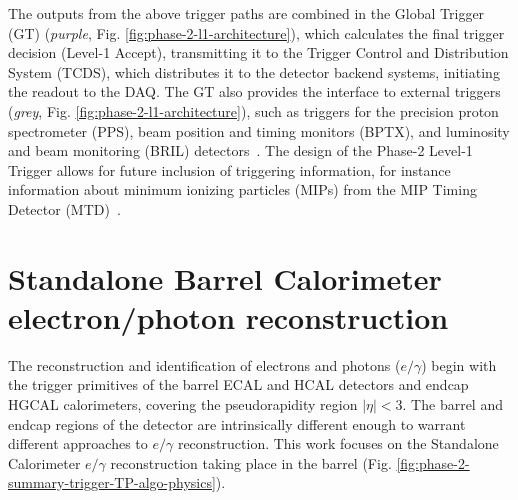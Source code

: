 The outputs from the above trigger paths are combined in the Global Trigger (GT) (\textit{purple}, Fig. \ref{fig:phase-2-l1-architecture}), which calculates the final trigger decision (Level-1 Accept), transmitting it to the Trigger Control and Distribution System (TCDS), which distributes it to the detector backend systems, initiating the readout to the DAQ. The GT also provides the interface to external triggers (\textit{grey}, Fig. \ref{fig:phase-2-l1-architecture}), such as triggers for the precision proton spectrometer (PPS), beam position and timing monitors (BPTX), and luminosity and beam monitoring (BRIL) detectors~\cite{CMS-TDR-021}. The design of the Phase-2 Level-1 Trigger allows for future inclusion of triggering information, for instance information about minimum ionizing particles (MIPs) from the MIP Timing Detector (MTD)~\cite{CERN-LHCC-2017-027}.

\section{Standalone Barrel Calorimeter electron/photon reconstruction}
\label{section:standalone_barrel_calo_egamma}
The reconstruction and identification of electrons and photons ($e/\gamma$) begin with the trigger primitives of the barrel ECAL and HCAL detectors and endcap HGCAL calorimeters, covering the pseudorapidity region $|\eta| < 3$. The barrel and endcap regions of the detector are intrinsically different enough to warrant different approaches to $e/\gamma$ reconstruction. This work focuses on the Standalone Calorimeter $e/\gamma$ reconstruction taking place in the barrel (Fig. \ref{fig:phase-2-summary-trigger-TP-algo-physics}).

